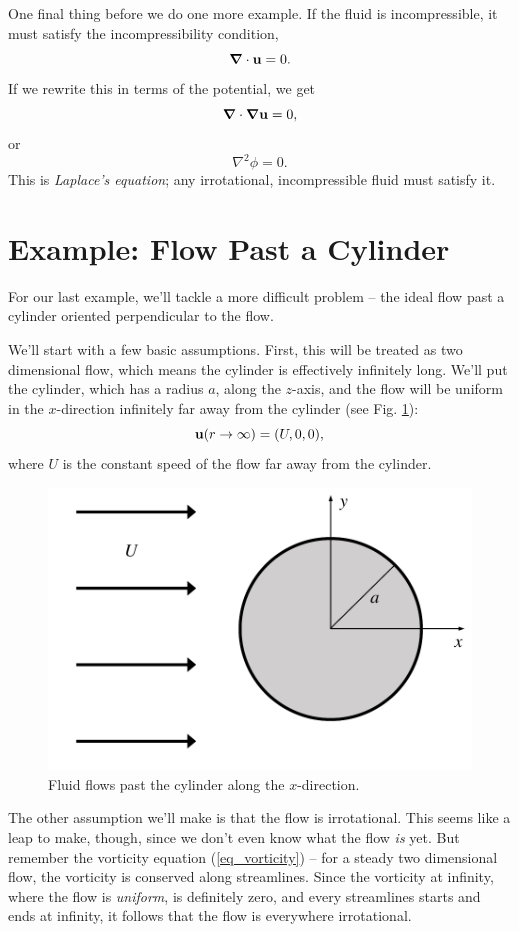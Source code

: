 One final thing before we do one more example.  If the fluid is incompressible, it must satisfy the incompressibility condition,
\[
\boldsymbol{\nabla} \cdot \mathbf{u} = 0.
\]
If we rewrite this in terms of the potential, we get
\[
\boldsymbol{\nabla} \cdot \boldsymbol{\nabla} \mathbf{u} = 0,
\]
or
\begin{equation}
\boxed{
\nabla^2 \phi = 0.
}
\end{equation}
This is \emph{Laplace's equation}; any irrotational, incompressible fluid must satisfy it.





\section{Example: Flow Past a Cylinder}
\label{sec_cylinder}

For our last example, we'll tackle a more difficult problem -- the ideal flow past a cylinder oriented perpendicular to the flow.

We'll start with a few basic assumptions.  First, this will be treated as two dimensional flow, which means the cylinder is effectively infinitely long.  We'll put the cylinder, which has a radius $a$, along the $z$-axis, and the flow will be uniform in the $x$-direction infinitely far away from the cylinder (see Fig. \ref{fig_cyl_setup}):
\begin{equation}
\label{eq_uniform}
\mathbf{u} (r \to \infty) = (U, 0, 0),
\end{equation}
where $U$ is the constant speed of the flow far away from the cylinder.

\begin{figure}
\centering\includegraphics[width=0.7\linewidth]{Figures/Chapter3/fig_cyl_setup}
\caption{Fluid flows past the cylinder along the $x$-direction.}
\label{fig_cyl_setup}
\end{figure}

The other assumption we'll make is that the flow is irrotational.  This seems like a leap to make, though, since we don't even know what the flow \emph{is} yet.  But remember the vorticity equation (\ref{eq_vorticity}) -- for a steady two dimensional flow, the vorticity is conserved along streamlines.  Since the vorticity at infinity, where the flow is \emph{uniform}, is definitely zero, and every streamlines starts and ends at infinity, it follows that the flow is everywhere irrotational.

